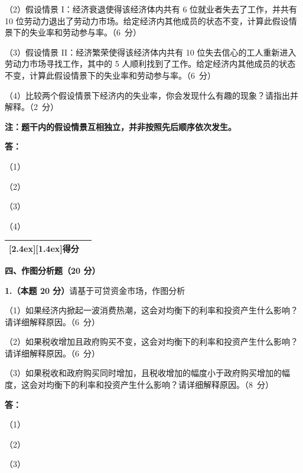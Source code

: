 \documentclass[UTF8,11pt,a4paper,fontset=fandol]{ctexart}
\newcommand{\scoretitle}[1]{%
  \noindent\begin{tabular}{|c|c|}\hline
  \raisebox{0pt}[2.4ex][1.4ex]{\bfseries 得分} & \makebox[1.15cm]{} \\ \hline
  \end{tabular}\hspace{1em}\textbf{#1}\par\vspace{0.6em}}
\newcommand{\blankpart}[1]{\noindent（#1）\par\vfill}
\begin{document}
（2）假设情景 I：经济衰退使得该经济体内共有 6 位就业者失去了工作，并共有 10 位劳动力退出了劳动力市场。给定经济内其他成员的状态不变，计算此假设情景下的失业率和劳动参与率。\mbox{（6 分）}

（3）假设情景 II：经济繁荣使得该经济体内共有 10 位失去信心的工人重新进入劳动力市场寻找工作，其中的 5 人顺利找到了工作。给定经济内其他成员的状态不变，计算此假设情景下的失业率和劳动参与率。\mbox{（6 分）}

（4）比较两个假设情景下经济内的失业率，你会发现什么有趣的现象？请指出并解释。\mbox{（2 分）}

\textbf{注：题干内的假设情景互相独立，并非按照先后顺序依次发生。}
\par\medskip\textbf{答：}\par\smallskip
\blankpart{1}\blankpart{2}\blankpart{3}\blankpart{4}
\newpage
\scoretitle{四、作图分析题（20 分）}
\textbf{1.（本题 20 分）}请基于可贷资金市场，作图分析

（1）如果经济内掀起一波消费热潮，这会对均衡下的利率和投资产生什么影响？\\
\hspace*{2em}请详细解释原因。\mbox{（6 分）}

（2）如果税收增加且政府购买不变，这会对均衡下的利率和投资产生什么影响？\\
\hspace*{2em}请详细解释原因。\mbox{（6 分）}

（3）如果税收和政府购买同时增加，且税收增加的幅度小于政府购买增加的幅度，这会对均衡下的利率和投资产生什么影响？\hspace{0pt}\mbox{请详细解释原因。（8 分）}
\par\medskip\textbf{答：}\par\smallskip
\blankpart{1}\blankpart{2}\blankpart{3}
\end{document}
